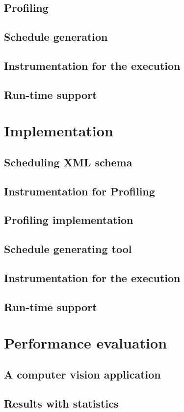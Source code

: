 \documentclass[a4paper,11pt,oneside]{book}
\begin{document}
\section{Profiling}
\section{Schedule generation}
\section{Instrumentation for the execution}
\section{Run-time support}

\chapter{Implementation}
\section{Scheduling XML schema}
\section{Instrumentation for Profiling}
\section{Profiling implementation}
\section{Schedule generating tool}
\section{Instrumentation for the execution}
\section{Run-time support}

\chapter{Performance evaluation}
\section{A computer vision application}
\section{Results with statistics}
\end{document}
